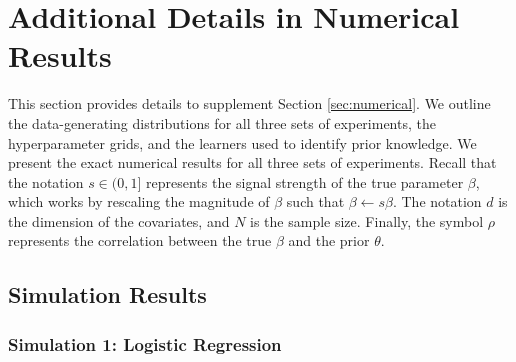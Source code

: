 \documentclass[12pt]{article}
\begin{document}




\setcounter{lemma}{0}
\renewcommand{\thelemma}{A\arabic{lemma}}
\setcounter{equation}{0}
\setcounter{algorithm}{0}
\setcounter{table}{0}
\setcounter{assumption}{0}
\renewcommand{\theequation}{A\arabic{equation}}
\renewcommand{\thealgorithm}{A\arabic{algorithm}}
\renewcommand{\thetable}{A\arabic{table}}
\renewcommand{\thedefinition}{A\arabic{definition}}
\renewcommand{\theprop}{A\arabic{prop}}
\renewcommand{\thetheorem}{A\arabic{theorem}}
\renewcommand{\theexample}{A\arabic{example}}
\renewcommand{\theassumption}{A\arabic{assumption}}

\clearpage
\newpage
\setcounter{page}{1}
\appendix

\section{Additional Details in Numerical Results}
This section provides  details to supplement Section \ref{sec:numerical}. We outline the data-generating distributions for all three sets of experiments, the hyperparameter grids, and the learners used to identify prior knowledge. We present the exact numerical results for all three sets of experiments. Recall that the notation \( s \in (0,1] \) represents the signal strength of the true parameter \( \beta \), which works by rescaling the magnitude of \( \beta \) such that \( \beta \gets s\beta \). The notation $d$ is the dimension of the covariates, and $N$ is the sample size. Finally, the symbol \( \rho \) represents the correlation between the true \( \beta \) and the prior \( \theta \).
\subsection{Simulation Results}
\subsubsection{Simulation 1: Logistic Regression}
\end{document}
